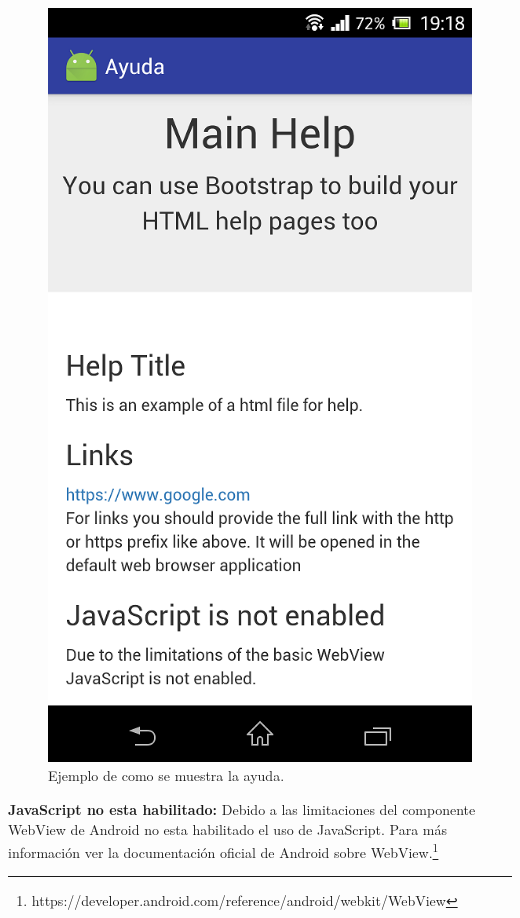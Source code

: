 \begin{figure}[H]
  \centering
    \includegraphics[scale=0.6]{50-anexos/B-uso/ayuda_ejemplo.png} 
    \caption{Ejemplo de como se muestra la ayuda.}
\end{figure}	
		

\textbf{JavaScript no esta habilitado:} Debido a las limitaciones del componente WebView de Android no esta habilitado el uso de JavaScript. Para más información ver la documentación oficial de Android sobre WebView.\footnote{https://developer.android.com/reference/android/webkit/WebView}

